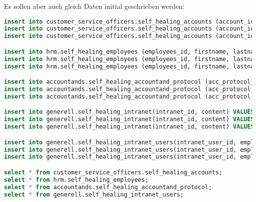 Es sollen aber auch gleich Daten initial geschrieben werden:
\lstset{style=gra_codestyle}
\begin{lstlisting}[language=sql, caption=StackGres-Citus - Self Healing Tests - Init Data,captionpos=b,label={lst:stackgres_citus-self-healing-init-data},breaklines=true]
insert into customer_service_officers.self_healing_accounts (account_id, firstname, lastname, birthday) VALUES (100, 'a', 'b', '01.01.2000');
insert into customer_service_officers.self_healing_accounts (account_id, firstname, lastname, birthday) VALUES (200, 'c', 'd', '01.01.2000');
insert into customer_service_officers.self_healing_accounts (account_id, firstname, lastname, birthday) VALUES (300, 'f', 'g', '01.01.2000');

insert into hrm.self_healing_employees (employees_id, firstname, lastname, birthday) VALUES (100, 'a', 'b', '01.01.2000');
insert into hrm.self_healing_employees (employees_id, firstname, lastname, birthday) VALUES (200, 'c', 'd', '01.01.2000');
insert into hrm.self_healing_employees (employees_id, firstname, lastname, birthday) VALUES (300, 'f', 'g', '01.01.2000');

insert into accountands.self_healing_accountand_protocol (acc_protocol_id, description, protocol_date, employees_id, rapport)  values (100, 'bla', '07.04.2024', 100, 'blabla');
insert into accountands.self_healing_accountand_protocol (acc_protocol_id, description, protocol_date, employees_id, rapport)  values (200, 'yada', '07.04.2024', 100, 'ydayadyada');
insert into accountands.self_healing_accountand_protocol (acc_protocol_id, description, protocol_date, employees_id, rapport)  values (300, 'something', '07.04.2024', 300, 'something');

insert into generell.self_healing_intranet(intranet_id, content) VALUES (100, 'yadada');
insert into generell.self_healing_intranet(intranet_id, content) VALUES (500, 'bla bla');
insert into generell.self_healing_intranet(intranet_id, content) VALUES (1000, 'talking and talking');

insert into generell.self_healing_intranet_users(intranet_user_id, employees_id) values(100, 100);
insert into generell.self_healing_intranet_users(intranet_user_id, employees_id) values(200, 200);
insert into generell.self_healing_intranet_users(intranet_user_id, employees_id) values(300, 300);

select * from customer_service_officers.self_healing_accounts;
select * from hrm.self_healing_employees;
select * from accountands.self_healing_accountand_protocol;
select * from generell.self_healing_intranet_users;
\end{lstlisting}

